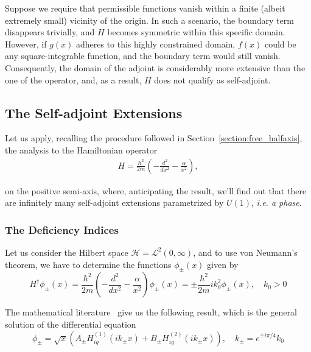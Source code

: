 \vspace{4mm}
\noindent
Suppose we require that permissible functions vanish within a finite (albeit extremely small) vicinity of the origin. In such a scenario, the boundary term disappears trivially, and $H$ becomes symmetric within this specific domain. However, if $g(x)$ adheres to this highly constrained domain, $f(x)$ could be any square-integrable function, and the boundary term would still vanish. Consequently, the domain of the adjoint is considerably more extensive than the one of the operator, and, as a result, $H$ does not qualify as self-adjoint.

\subsection{The Self-adjoint Extensions}

Let us apply, recalling the procedure followed in Section~\ref{section:free_halfaxis}, the analysis to the Hamiltonian operator
\begin{align*}
    H = \frac{\hbar^2}{2m} \left(-\frac{d^2}{dx^2} - \frac{\alpha}{x^2}\right),
\end{align*}


on the positive semi-axis, where, anticipating the result, we'll find out that there are infinitely many self-adjoint extensions parametrized by $U(1)$, \textit{i.e. a phase}.

\subsubsection*{The Deficiency Indices}

Let us consider the Hilbert space $\mathcal{H} = \mathcal{L}^2(0, \infty)$, and to use von Neumann's theorem, we have to determine the functions $\phi_{\pm}(x)$ given by
\begin{equation} \label{eq:potential_H}
    H^\dagger \phi_{\pm}(x) = \frac{\hbar^2}{2m} (-\frac{d^2}{dx^2} - \frac{\alpha}{x^2}) \phi_{\pm}(x) = \pm \frac{\hbar^2}{2m} ik^2_0 \phi_{\pm}(x), \quad k_0 > 0
\end{equation}

\noindent
The mathematical literature~\cite{garfken67:math} give us the following result, which is the general solution of the differential equation
\begin{equation*}
    \phi_{\pm} = \sqrt{x}\left(A_\pm H_{ig}^{(1)}(ik_\pm x) + B_\pm H_{ig}^{(2)}(ik_\pm x)\right), \quad k_{\pm} = e^{\mp i \pi/4} k_0
\end{equation*}

